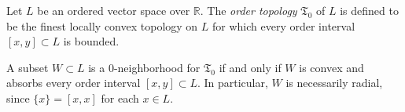 Let $L$ be an ordered vector space over $\mathbb{R}$. The \textit{order topology} $\mathfrak{T}_0$ of $L$ is defined to be the finest locally convex topology on $L$ for which every order interval $[x, y] \subset L$ is bounded.

A subset $W \subset L$ is a $0$-neighborhood for $\mathfrak{T}_0$ if and only if $W$ is convex and absorbs every order interval $[x, y] \subset L$. In particular, $W$ is necessarily radial, since $\{x\} = [x, x]$ for each $x \in L$.
